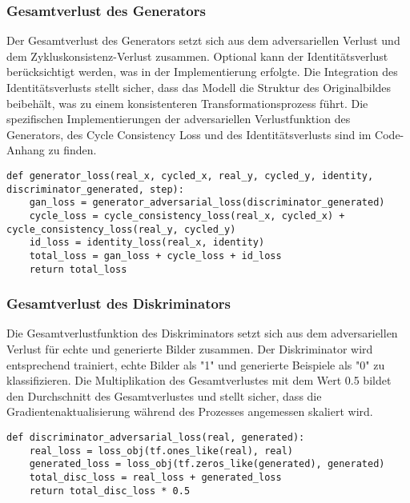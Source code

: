 \subsubsection{Gesamtverlust des Generators}
Der Gesamtverlust des Generators setzt sich aus dem adversariellen Verlust und dem Zykluskonsistenz-Verlust zusammen. Optional kann der Identitätsverlust berücksichtigt werden, was in der Implementierung erfolgte. Die Integration des Identitätsverlusts stellt sicher, dass das Modell die Struktur des Originalbildes beibehält, was zu einem konsistenteren Transformationsprozess führt. Die spezifischen Implementierungen der adversariellen Verlustfunktion des Generators, des Cycle Consistency Loss und des Identitätsverlusts sind im Code-Anhang zu finden.
\begin{lstlisting}[language=pyhaff, caption={Vorverarbeitung des Datensatzes: Jittering}, label={cod:cycleGanGeneratorVerlust}]
def generator_loss(real_x, cycled_x, real_y, cycled_y, identity, discriminator_generated, step):
    gan_loss = generator_adversarial_loss(discriminator_generated)
    cycle_loss = cycle_consistency_loss(real_x, cycled_x) + cycle_consistency_loss(real_y, cycled_y)
    id_loss = identity_loss(real_x, identity)
    total_loss = gan_loss + cycle_loss + id_loss
    return total_loss
\end{lstlisting}

\subsubsection{Gesamtverlust des Diskriminators}
Die Gesamtverlustfunktion des Diskriminators setzt sich aus dem adversariellen Verlust für echte und generierte Bilder zusammen. Der Diskriminator wird entsprechend trainiert, echte Bilder als "1" und generierte Beispiele als "0" zu klassifizieren. Die Multiplikation des Gesamtverlustes mit dem Wert 0.5 bildet den Durchschnitt des Gesamtverlustes und stellt sicher, dass die Gradientenaktualisierung während des Prozesses angemessen skaliert wird.
\newpage
\begin{lstlisting}[language=pyhaff, caption={Vorverarbeitung des Datensatzes: Jittering}, label={cod:cycleGanDiscriminatorVerlust}]
def discriminator_adversarial_loss(real, generated):
    real_loss = loss_obj(tf.ones_like(real), real)
    generated_loss = loss_obj(tf.zeros_like(generated), generated)
    total_disc_loss = real_loss + generated_loss
    return total_disc_loss * 0.5
\end{lstlisting}

